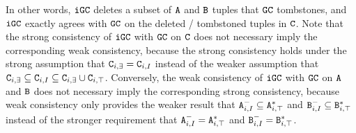 
In other words, $\tt{iGC}$ deletes a subset of $\tt{A}$ and $\tt{B}$ tuples that $\tt{GC}$ tombstones, and $\tt{iGC}$ exactly agrees with $\tt{GC}$ on the deleted / tombstoned tuples in $\tt{C}$.
Note that the strong consistency of $\tt{iGC}$ with $\tt{GC}$ on $\tt{C}$ does not necessary imply the corresponding weak consistency, because the strong consistency holds under the strong assumption that $\tt{C}_{i,\exists} = \tt{C}_{i,I}$ instead of the weaker assumption that $\tt{C}_{i,\exists} \subseteq \tt{C}_{i,I} \subseteq \tt{C}_{i,\exists} \cup \tt{C}_{i,\top}$.
Conversely, the weak consistency of $\tt{iGC}$ with $\tt{GC}$ on $\tt{A}$ and $\tt{B}$ does not necessary imply the corresponding strong consistency, because weak consistency only provides the weaker result that $\tt{A}_{i,I}^- \subseteq \tt{A}_{i,\top}^*$ and $\tt{B}_{i,I}^- \subseteq \tt{B}_{i,\top}^*$ instead of the stronger requirement that $\tt{A}_{i,I}^- = \tt{A}_{i,\top}^*$ and $\tt{B}_{i,I}^- = \tt{B}_{i,\top}^*$.



